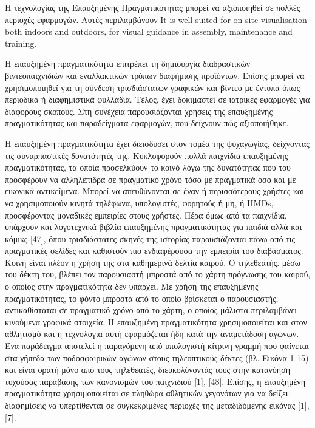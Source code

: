 Η τεχνολογίας της Επαυξημένης Πραγματικότητας μπορεί να αξιοποιηθεί σε πολλές περιοχές εφαρμογών. Αυτές περιλαμβάνουν  It is well suited for on-site visualisation both indoors and outdoors, for visual guidance in assembly, maintenance and training.

Η επαυξημένη πραγματικότητα επιτρέπει τη δημιουργία διαδραστικών βιντεοπαιχνιδιών και εναλλακτικών τρόπων διαφήμισης προϊόντων. Επίσης μπορεί να χρησιμοποιηθεί για τη σύνδεση τρισδιάστατων γραφικών και βίντεο με έντυπα όπως περιοδικά ή διαφημιστικά φυλλάδια. Τέλος, έχει δοκιμαστεί σε ιατρικές εφαρμογές για διάφορους σκοπούς. Στη συνέχεια παρουσιάζονται χρήσεις της επαυξημένης πραγματικότητας και παραδείγματα εφαρμογών, που δείχνουν πώς αξιοποιήθηκε.  




Η επαυξημένη πραγματικότητα έχει διεισδύσει στον τομέα της ψυχαγωγίας, δείχνοντας τις συναρπαστικές δυνατότητές της. Κυκλοφορούν πολλά παιχνίδια επαυξημένης πραγματικότητας, τα οποία προσελκύουν το κοινό λόγω της δυνατότητας που του προσφέρουν να αλληλεπιδρά σε πραγματικό χρόνο τόσο με πραγματικά όσο και με εικονικά αντικείμενα. Μπορεί να απευθύνονται σε έναν ή περισσότερους χρήστες και να χρησιμοποιούν κινητά τηλέφωνα, υπολογιστές, φορητούς ή μη, ή ΗΜDs, προσφέροντας μοναδικές εμπειρίες στους χρήστες. Πέρα όμως από τα παιχνίδια, υπάρχουν και λογοτεχνικά βιβλία επαυξημένης πραγματικότητας για παιδιά αλλά και κόμικς [47], όπου τρισδιάστατες σκηνές της ιστορίας παρουσιάζονται πάνω από τις πραγματικές σελίδες και καθιστούν πιο ενδιαφέρουσα την εμπειρία του διαβάσματος. Κοινή είναι πλέον η χρήση της στα καθημερινά δελτία καιρού. Ο τηλεθεατής. μέσω του δέκτη του, βλέπει τον παρουσιαστή μπροστά από το χάρτη πρόγνωσης του καιρού, ο οποίος στην πραγματικότητα δεν υπάρχει. Με χρήση της επαυξημένης πραγματικότητας, το φόντο μπροστά από το οποίο βρίσκεται ο παρουσιαστής, αντικαθίσταται σε πραγματικό χρόνο από το χάρτη, ο οποίος μάλιστα περιλαμβάνει κινούμενα γραφικά στοιχεία. Η επαυξημένη πραγματικότητα χρησιμοποιείται και στον αθλητισμό και η τεχνολογία αυτή εφαρμόζεται ήδη κατά την αναμετάδοση αγώνων. Ένα παράδειγμα αποτελεί η παραγόμενη από υπολογιστή κίτρινη γραμμή που φαίνεται στα γήπεδα των ποδοσφαιρικών αγώνων στους τηλεοπτικούς δέκτες (βλ. Εικόνα 1-15) και είναι ορατή μόνο από τους τηλεθεατές, διευκολύνοντάς τους στην κατανόηση τυχούσας παράβασης των κανονισμών του παιχνιδιού [1], [48]. Επίσης, η επαυξημένη πραγματικότητα χρησιμοποιείται σε πληθώρα αθλητικών γεγονότων για να δείξει διαφημίσεις να υπερτίθενται σε συγκεκριμένες περιοχές της μεταδιδόμενης εικόνας [1], [7].


